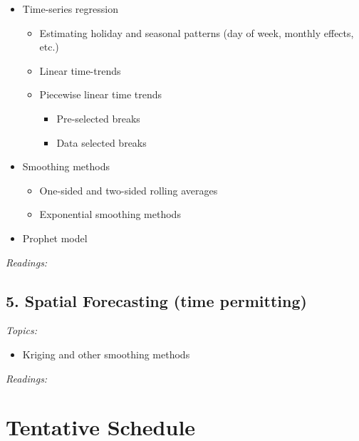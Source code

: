 \documentclass[12pt]{article}
\begin{document}
\begin{itemize}
  \item Time-series regression

  \begin{itemize}
    \item Estimating holiday and seasonal patterns (day of week, monthly effects, etc.)
    
    \item Linear time-trends
    
    \item Piecewise linear time trends
    \begin{itemize}
      \item Pre-selected breaks
      \item Data selected breaks
    \end{itemize}
  \end{itemize}

  \item Smoothing methods
  \begin{itemize}
    \item One-sided and two-sided rolling averages
    \item Exponential smoothing methods
  \end{itemize}

  \item Prophet model
\end{itemize}

\bigskip
\noindent\emph{Readings:}


\subsection*{5. Spatial Forecasting (time permitting)}

\noindent\emph{Topics:}

\begin{itemize}
  \item Kriging and other smoothing methods
\end{itemize}

\bigskip
\noindent\emph{Readings:}



\newpage
\section*{Tentative Schedule}




\end{document}
